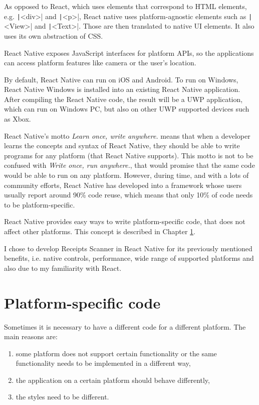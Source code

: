 \documentclass[
  digital, %
  table,   %
  oneside, %
  lof,     %
  lot,     %
]{fithesis3}
\newcommand{\code}[1]{\texttt|#1|} %
\begin{document}
As opposed to React, which uses elements that correspond to HTML elements, e.g. \code{<div>} and \code{<p>}, React native uses platform-agnostic elements such as \code{<View>} and \code{<Text>}. Those are then translated to native UI elements. It also uses its own abstraction of CSS.

React Native exposes JavaScript interfaces for platform APIs, so the applications can access platform features like camera or the user’s location.

By default, React Native can run on iOS and Android. To run on Windows, React Native Windows is installed into an existing React Native application. After compiling the React Native code, the result will be a UWP application, which can run on Windows PC, but also on other UWP supported devices such as Xbox.

React Native's motto \textit{Learn once, write anywhere.} means that when a developer learns the concepts and syntax of React Native, they should be able to write programs for any platform (that React Native supports). This motto is not to be confused with \textit{Write once, run anywhere.}, that would promise that the same code would be able to run on any platform. However, during time, and with a lots of community efforts, React Native has developed into a framework whose users usually report around 90\% code reuse, which means that only 10\% of code needs to be platform-specific. 

React Native provides easy ways to write platform-specific code, that does not affect other platforms. This concept is described in Chapter \ref{chap:platform_specific_code}.

I chose to develop Receipts Scanner in React Native for its previously mentioned benefits, i.e. native controls, performance, wide range of supported platforms and also due to my familiarity with React.

\chapter{Platform-specific code}
\label{chap:platform_specific_code}
Sometimes it is necessary to have a different code for a different platform. The main reasons are:
\begin{enumerate}
\item some platform does not support certain functionality or the same functionality needs to be implemented in a different way,
\item the application on a certain platform should behave differently,
\item the styles need to be different.
\end{enumerate}
\end{document}
